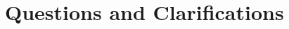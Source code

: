 \documentclass[twoside]{article}
\numberwithin{equation}{section}
\begin{document}
\section{Questions and Clarifications}

%






\begin{footnotesize}


\end{footnotesize}
 
%
%
%
%
%
%
%
%
%
%
\end{document}
